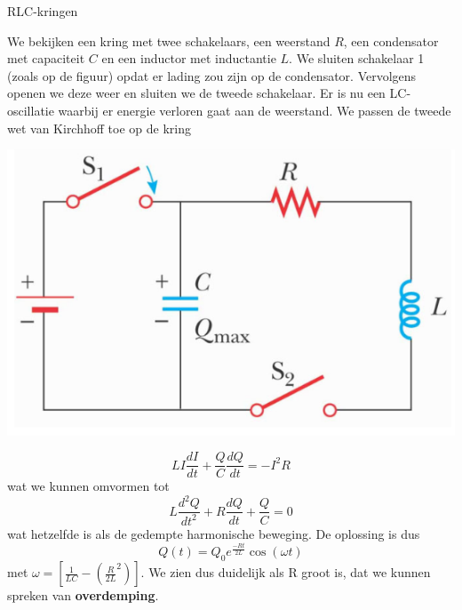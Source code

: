 \begin{app}{RLC-kringen}
    \vspace{-0.5cm}
    \begin{minipage}{.73\textwidth}
        \vspace{0.2cm}
        We bekijken een kring met twee schakelaars, een weerstand $R$, een condensator met capaciteit $C$ en een inductor
        met inductantie $L$. We sluiten schakelaar 1 (zoals op de figuur) opdat er lading zou zijn op de condensator. 
        Vervolgens openen we deze weer en sluiten we de tweede schakelaar. Er is nu een LC-oscillatie waarbij er energie verloren gaat aan de weerstand.
        We passen de tweede wet van Kirchhoff toe op de kring
    \end{minipage}
    \begin{minipage}{.23\textwidth}
        \vspace{0.3cm}\includegraphics[scale = 0.45]{Images/Magnetisme/RLCKring}
    \end{minipage}
    \vspace{-0.25cm}
    \begin{equation*}
        LI\dfrac{dI}{dt} + \dfrac{Q}{C}\dfrac{dQ}{dt} = -I^2R
    \end{equation*}
    wat we kunnen omvormen tot
    \begin{equation*}
        L\dfrac{d^2Q}{dt^2} + R\dfrac{dQ}{dt} + \dfrac{Q}{C} = 0
    \end{equation*}
    wat hetzelfde is als de gedempte harmonische beweging. De oplossing is dus
    \begin{equation*}
        Q(t) = Q_{0}e^{\tfrac{-Rt}{2L}}\cos(\omega t)
    \end{equation*}
    met $\omega = \left[\tfrac{1}{LC} - (\tfrac{R}{2L}^2)\right]$. We zien dus duidelijk als R groot is,
    dat we kunnen spreken van \textbf{overdemping}.
\end{app}


